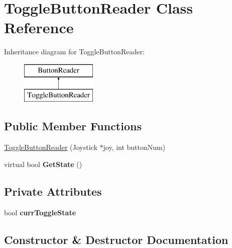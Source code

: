 \hypertarget{class_toggle_button_reader}{}\section{Toggle\+Button\+Reader Class Reference}
\label{class_toggle_button_reader}
Inheritance diagram for Toggle\+Button\+Reader\+:\begin{figure}[H]
\begin{center}
\leavevmode
\includegraphics[height=2.000000cm]{class_toggle_button_reader}
\end{center}
\end{figure}
\subsection*{Public Member Functions}
\begin{DoxyCompactItemize}
\item 
\hyperlink{class_toggle_button_reader_af843241ff4ac0ce1c7806b910465b082}{Toggle\+Button\+Reader} (Joystick $\ast$joy, int button\+Num)
\item 
\mbox{\label{class_toggle_button_reader_a9141b60884e4fcef08d8bde89155feff}} 
virtual bool {\bfseries Get\+State} ()
\end{DoxyCompactItemize}
\subsection*{Private Attributes}
\begin{DoxyCompactItemize}
\item 
\mbox{\label{class_toggle_button_reader_a32f620dffec59210d1d90c747a41d5d6}} 
bool {\bfseries curr\+Toggle\+State}
\end{DoxyCompactItemize}


\subsection{Constructor \& Destructor Documentation}
\mbox{\label{class_toggle_button_reader_af843241ff4ac0ce1c7806b910465b082}} 
